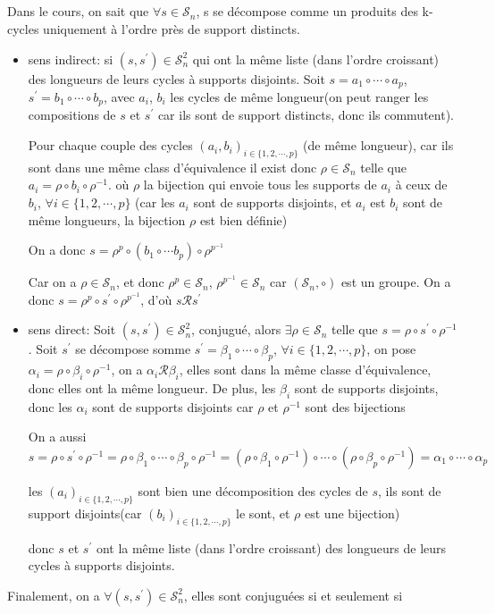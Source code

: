 \documentclass[a4paper,12pt]{book}
\begin{document}
\subsection{}
Dans le cours, on sait que $\forall s \in \mathscr{S}_n$, s se décompose comme un produits des k-cycles uniquement à l'ordre près de support distincts. 
\begin{itemize}
    \item sens indirect: si $(s,s^{'}) \in \mathscr{S}_n^2$ qui ont la même liste (dans l’ordre croissant) des longueurs de leurs cycles à supports disjoints. 
    Soit $s=a_1\circ \cdots \circ a_p$, $s^{'}=b_1\circ \cdots \circ b_p$, avec $a_i$, $b_i$ les cycles de même longueur(on peut ranger les compositions de $s$ et $s^{'}$ car ils sont de support distincts, donc ils commutent).
    
    Pour chaque couple des cycles $(a_i,b_i)_{i \in \{1,2,\cdots,p\}}$ (de même longueur), car ils sont dans une même class d'équivalence il exist donc $\rho \in \mathscr{S}_n$ telle que $a_i=\rho\circ b_i\circ\rho^{-1}$. 
    où $\rho$ la bijection qui envoie tous les supports de $a_i$ à ceux de $b_i$, $\forall i \in \{1,2,\cdots,p\}$ (car les $a_i$ sont de supports disjoints, et $a_i$ est $b_i$ sont de même longueurs, la bijection $\rho$ est bien définie)

    On a donc $s=\rho^p\circ(b_1\circ\cdots b_p)\circ\rho^{p^{-1}}$
    
    Car on a $\rho\in\mathscr{S}_n$, et donc 
    $\rho^{p}\in \mathscr{S}_n$, $\rho^{p^{-1}}\in \mathscr{S}_n$ car $(\mathscr{S}_n,\circ)$ est un groupe. On a donc $s=\rho^p\circ s^{'}\circ\rho^{p^{-1}}$, d'où $s \mathcal{R}s^{'}$
    \item sens direct: Soit $(s,s^{'})\in \mathscr{S}_n^2$, conjugué, alors $\exists \rho \in \mathscr{S}_n$ telle que $s=\rho\circ s^{'}\circ \rho^{-1}$. Soit $s^{'}$ se décompose somme 
    $s^{'}=\beta_1\circ\cdots\circ\beta_p$, $\forall i \in \{1,2,\cdots,p\}$, on pose $\alpha_i=\rho\circ\beta_i\circ\rho^{-1}$, on a $\alpha_i \mathcal{R} \beta_i$, elles sont dans la même classe d'équivalence, donc elles ont la même longueur. 
    De plus, les $\beta_i$ sont de supports disjoints, donc les $\alpha_i$ sont de supports disjoints car $\rho$ et $\rho^{-1}$ sont des bijections
    
    On a aussi $s=\rho\circ s^{'}\circ\rho^{-1}=\rho\circ\beta_1\circ\cdots\circ\beta_p\circ\rho^{-1}=(\rho\circ \beta_1\circ\rho^{-1})\circ\cdots\circ(\rho\circ \beta_p\circ\rho^{-1})=\alpha_1\circ\cdots\circ\alpha_p$
    
    les $(a_i)_{i \in \{1,2,\cdots,p\}}$ sont bien une décomposition des cycles de $s$, ils sont de support disjoints(car $(b_i)_{i \in \{1,2,\cdots,p\}}$ le sont, et $\rho$ est une bijection)

    donc $s$ et $s^{'}$ ont la même liste (dans l’ordre croissant) des longueurs de leurs cycles à supports disjoints.
\end{itemize}
Finalement, on a $\forall (s,s^{'}) \in \mathscr{S}_n^2$, 
elles sont conjuguées si et seulement si 

\end{document}
